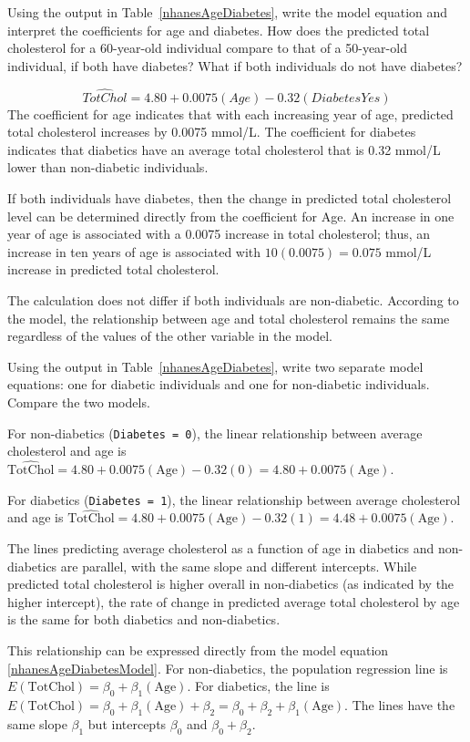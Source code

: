 \begin{example}{Using the output in Table~\ref{nhanesAgeDiabetes}, write the model equation and interpret the coefficients for age and diabetes. How does the predicted total cholesterol for a 60-year-old individual compare to that of a 50-year-old individual, if both have diabetes? What if both individuals do not have diabetes?}
	
\[\widehat{TotChol} = 4.80 + 0.0075(Age) - 0.32(DiabetesYes) \]	
The coefficient for age indicates that with each increasing year of age, predicted total cholesterol increases by 0.0075 mmol/L. The coefficient for diabetes indicates that diabetics have an average total cholesterol that is 0.32 mmol/L lower than non-diabetic individuals. 

If both individuals have diabetes, then the change in predicted total cholesterol level can be determined directly from the coefficient for Age. An increase in one year of age is associated with a 0.0075 increase in total cholesterol; thus, an increase in ten years of age is associated with $10(0.0075) = 0.075$ mmol/L increase in predicted total cholesterol.

The calculation does not differ if both individuals are non-diabetic. According to the model, the relationship between age and total cholesterol remains the same regardless of the values of the other variable in the model. 
\end{example}

\begin{example}{Using the output in Table~\ref{nhanesAgeDiabetes}, write two separate model equations: one for diabetic individuals and one for non-diabetic individuals. Compare the two models.}
	
For non-diabetics (\texttt{Diabetes = 0}), the linear relationship between average cholesterol and age is $\widehat{\text{TotChol}} = 4.80 + 0.0075(\text{Age}) - 0.32(0) = 4.80 + 0.0075(\text{Age}).$

For diabetics (\texttt{Diabetes = 1}), the linear relationship between average cholesterol and age is $\widehat{\text{TotChol}} = 4.80 + 0.0075(\text{Age}) - 0.32(1) = 4.48 + 0.0075(\text{Age}).$

The lines predicting average cholesterol as a function of age in diabetics and non-diabetics are parallel, with the same slope and different intercepts. While predicted total cholesterol is higher overall in non-diabetics (as indicated by the higher intercept), the rate of change in predicted average total cholesterol by age is the same for both diabetics and non-diabetics.

This relationship can be expressed directly from the model equation \ref{nhanesAgeDiabetesModel}. For non-diabetics, the population regression line is $E(\text{TotChol}) = \beta_0 + \beta_1(\text{Age})$. For diabetics, the line is $E(\text{TotChol}) = \beta_0 + \beta_1(\text{Age}) + \beta_2 = \beta_0 + \beta_2 + \beta_1(\text{Age})$. The lines have the same slope $\beta_1$ but intercepts $\beta_0$ and $\beta_0 + \beta_2$.
\label{nhanesNoInteractionModelFit}	
\end{example}

